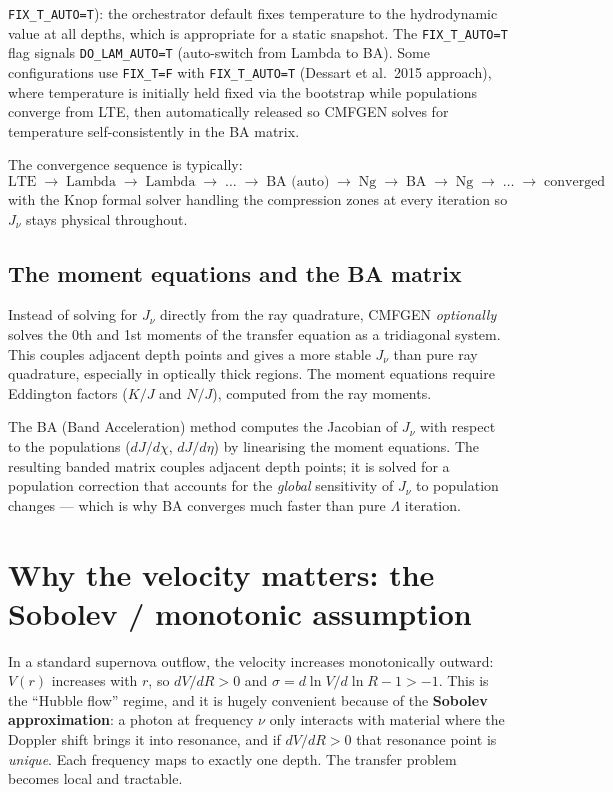 \documentclass[11pt]{article}
\begin{document}
\begin{enumerate}[nosep]
        \texttt{FIX\_T\_AUTO=T}): the orchestrator default fixes
        temperature to the hydrodynamic value at all depths, which is
        appropriate for a static snapshot.  The
        \texttt{FIX\_T\_AUTO=T} flag signals \texttt{DO\_LAM\_AUTO=T}
        (auto-switch from Lambda to BA).  Some configurations use
        \texttt{FIX\_T=F} with \texttt{FIX\_T\_AUTO=T} (Dessart et al.\
        2015 approach), where temperature is initially held fixed via
        the bootstrap while populations converge from LTE, then
        automatically released so CMFGEN solves for temperature
        self-consistently in the BA matrix.
\end{enumerate}

The convergence sequence is typically:
\[
  \text{LTE} \;\to\; \text{Lambda} \;\to\; \text{Lambda}
  \;\to\; \dots \;\to\; \text{BA (auto)} \;\to\; \text{Ng}
  \;\to\; \text{BA} \;\to\; \text{Ng} \;\to\; \dots
  \;\to\; \text{converged}
\]
with the Knop formal solver handling the compression zones at every
iteration so $J_\nu$ stays physical throughout.

\subsection{The moment equations and the BA matrix}

Instead of solving for $J_\nu$ directly from the ray quadrature, CMFGEN
\emph{optionally} solves the 0th and 1st moments of the transfer
equation as a tridiagonal system.  This couples adjacent depth points
and gives a more stable $J_\nu$ than pure ray quadrature, especially in
optically thick regions.  The moment equations require Eddington
factors ($K/J$ and $N/J$), computed from the ray moments.

The BA (Band Acceleration) method computes the Jacobian of $J_\nu$ with
respect to the populations ($dJ/d\chi$, $dJ/d\eta$) by linearising the
moment equations.  The resulting banded matrix couples adjacent depth
points; it is solved for a population correction that accounts for the
\emph{global} sensitivity of $J_\nu$ to population changes --- which is
why BA converges much faster than pure $\Lambda$ iteration.

\section{Why the velocity matters: the Sobolev / monotonic assumption}

In a standard supernova outflow, the velocity increases monotonically
outward: $V(r)$ increases with $r$, so $dV/dR > 0$ and
$\sigma = d\ln V/d\ln R - 1 > -1$.  This is the ``Hubble flow'' regime,
and it is hugely convenient because of the \textbf{Sobolev
approximation}: a photon at frequency $\nu$ only interacts with material
where the Doppler shift brings it into resonance, and if $dV/dR > 0$
that resonance point is \emph{unique}.  Each frequency maps to exactly
one depth.  The transfer problem becomes local and tractable.
\end{document}

